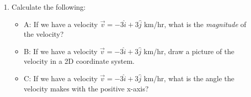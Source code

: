 \documentclass{article}
\begin{document}
\begin{enumerate}
\item Calculate the following:
\begin{itemize}
\item A: If we have a velocity $\vec{v} = -3\hat{i} + 3\hat{j}$ km/hr, what is the \textit{magnitude} of the velocity?
\item B: If we have a velocity $\vec{v} = -3\hat{i} + 3\hat{j}$ km/hr, draw a picture of the velocity in a 2D coordinate system.
\item C: If we have a velocity $\vec{v} = -3\hat{i} + 3\hat{j}$ km/hr, what is the angle the velocity makes with the positive x-axis?
\end{itemize}
\end{enumerate}
\end{document}
